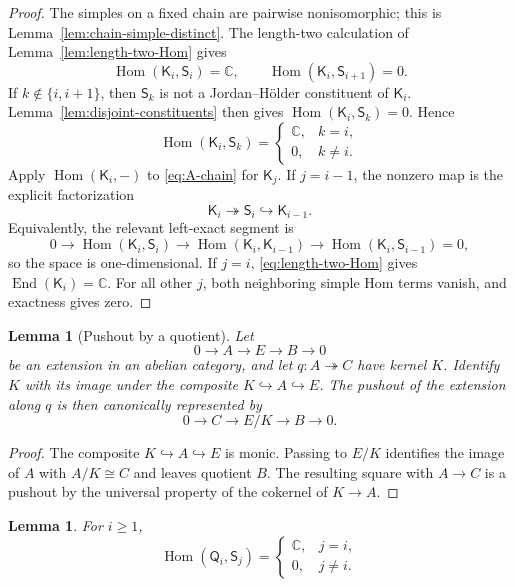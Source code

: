 \documentclass[12pt,leqno]{amsart}
\numberwithin{equation}{section}
\newtheorem{lem}[thm]{Lemma}
\newcommand{\End}{\operatorname{End}}
\newcommand{\Hom}{\operatorname{Hom}}
\def\C{\mathbb{C}}
\begin{document}
\begin{proof}
The simples on a fixed chain are pairwise nonisomorphic; this is
Lemma~\ref{lem:chain-simple-distinct}.  The length-two calculation of
Lemma~\ref{lem:length-two-Hom} gives
\[
 \Hom(\mathsf K_i,\mathsf S_i)=\C,
 \qquad
 \Hom(\mathsf K_i,\mathsf S_{i+1})=0.
\]
If $k\notin\{i,i+1\}$, then $\mathsf S_k$ is not a Jordan--H\"older
constituent of $\mathsf K_i$.  Lemma~\ref{lem:disjoint-constituents}
then gives $\Hom(\mathsf K_i,\mathsf S_k)=0$.  Hence
\[
 \Hom(\mathsf K_i,\mathsf S_k)=
 \begin{cases}\C,&k=i,\\0,&k\ne i.\end{cases}
\]
Apply $\Hom(\mathsf K_i,-)$ to \eqref{eq:A-chain} for $\mathsf K_j$.
If $j=i-1$, the nonzero map is the explicit factorization
\[
 \mathsf K_i\twoheadrightarrow\mathsf S_i
 \hookrightarrow\mathsf K_{i-1}.
\]
Equivalently, the relevant left-exact segment is
\[
 0\longrightarrow\Hom(\mathsf K_i,\mathsf S_i)
 \longrightarrow\Hom(\mathsf K_i,\mathsf K_{i-1})
 \longrightarrow\Hom(\mathsf K_i,\mathsf S_{i-1})=0,
\]
so the space is one-dimensional.  If $j=i$, \eqref{eq:length-two-Hom} gives
$\End(\mathsf K_i)=\C$.  For all other $j$, both neighboring simple Hom
terms vanish, and exactness gives zero.
\end{proof}

\begin{lem}[Pushout by a quotient]\label{lem:pushout-quotient}
Let
\[
 0\longrightarrow A\longrightarrow E\longrightarrow B\longrightarrow0
\]
be an extension in an abelian category, and let $q:A\twoheadrightarrow C$
have kernel $K$.  Identify $K$ with its image under the composite
$K\hookrightarrow A\hookrightarrow E$.  The pushout of the extension
along $q$ is then canonically represented by
\[
 0\longrightarrow C\longrightarrow E/K\longrightarrow B\longrightarrow0.
\]
\end{lem}

\begin{proof}
The composite $K\hookrightarrow A\hookrightarrow E$ is monic.  Passing to
$E/K$ identifies the image of $A$ with $A/K\cong C$ and leaves quotient
$B$.  The resulting square with $A\to C$ is a pushout by the universal
property of the cokernel of $K\to A$.
\end{proof}

\begin{lem}\label{lem:Q-simple-Hom}
For $i\geq1$,
\[
 \Hom(\mathsf Q_i,\mathsf S_j)=
 \begin{cases}
  \C,&j=i,\\
  0,&j\neq i.
 \end{cases}
\]
\end{lem}
\end{document}
